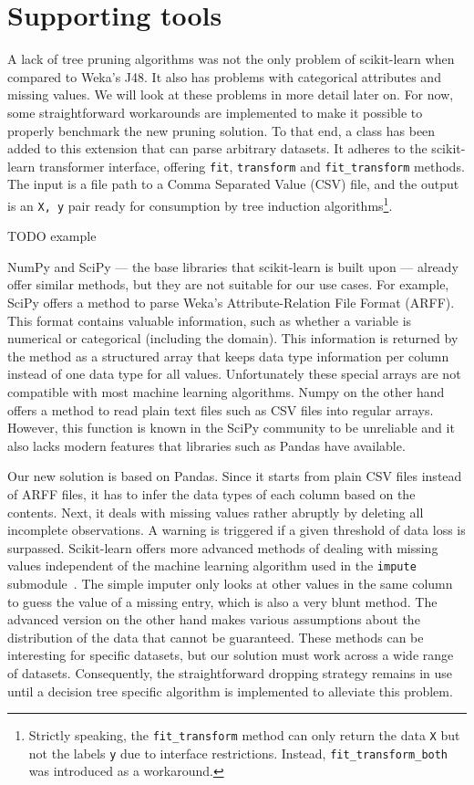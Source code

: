 \section{Supporting tools}
A lack of tree pruning algorithms was not the only problem of scikit-learn when compared to Weka's J48. It also has problems with categorical attributes and missing values. We will look at these problems in more detail later on. For now, some straightforward workarounds are implemented to make it possible to properly benchmark the new pruning solution. To that end, a  class has been added to this extension that can parse arbitrary datasets. It adheres to the scikit-learn transformer interface, offering \texttt{fit}, \texttt{transform} and \texttt{fit\_transform} methods. The input is a file path to a Comma Separated Value (CSV) file, and the output is an \texttt{X, y} pair ready for consumption by tree induction algorithms\footnote{Strictly speaking, the \texttt{fit\_transform} method can only return the data \texttt{X} but not the labels \texttt{y} due to interface restrictions. Instead, \texttt{fit\_transform\_both} was introduced as a workaround.}.

TODO example

NumPy and SciPy --- the base libraries that scikit-learn is built upon --- already offer similar methods, but they are not suitable for our use cases. For example, SciPy offers a method to parse Weka's Attribute-Relation File Format (ARFF). This format contains valuable information, such as whether a variable is numerical or categorical (including the domain). This information is returned by the method as a structured array that keeps data type information per column instead of one data type for all values. Unfortunately these special arrays are not compatible with most machine learning algorithms. Numpy on the other hand offers a method to read plain text files such as CSV files into regular arrays. However, this function is known in the SciPy community to be unreliable and it also lacks modern features that libraries such as Pandas have available.

Our new solution is based on Pandas. Since it starts from plain CSV files instead of ARFF files, it has to infer the data types of each column based on the contents. Next, it deals with missing values rather abruptly by deleting all incomplete observations. A warning is triggered if a given threshold of data loss is surpassed. Scikit-learn offers more advanced methods of dealing with missing values independent of the machine learning algorithm used in the \texttt{impute} submodule~\cite{imputation}. The simple imputer only looks at other values in the same column to guess the value of a missing entry, which is also a very blunt method. The advanced version on the other hand makes various assumptions about the distribution of the data that cannot be guaranteed. These methods can be interesting for specific datasets, but our solution must work across a wide range of datasets. Consequently, the straightforward dropping strategy remains in use until a decision tree specific algorithm is implemented to alleviate this problem.

